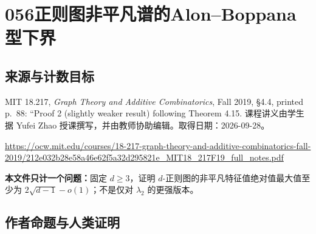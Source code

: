 \documentclass[UTF8,11pt]{ctexart}
\theoremstyle{definition}
\begin{document}
\section*{056\quad 正则图非平凡谱的Alon--Boppana型下界}
\subsection*{来源与计数目标}
MIT 18.217, \emph{Graph Theory and Additive Combinatorics}, Fall 2019, \S4.4, printed p.~88: ``Proof 2 (slightly weaker result) following Theorem 4.15. 课程讲义由学生据 Yufei Zhao 授课撰写，并由教师协助编辑。取得日期：2026-09-28。
\par\url{https://ocw.mit.edu/courses/18-217-graph-theory-and-additive-combinatorics-fall-2019/212e032b28e58a46e62f5a32d295821e_MIT18_217F19_full_notes.pdf}
\par\textbf{本文件只计一个问题：}固定 $d\geq3$，证明 $d$-正则图的非平凡特征值绝对值最大值至少为 $2\sqrt{d-1}-o(1)$；不是仅对 $\lambda_2$ 的更强版本。
\subsection*{作者命题与人类证明}
\end{document}

